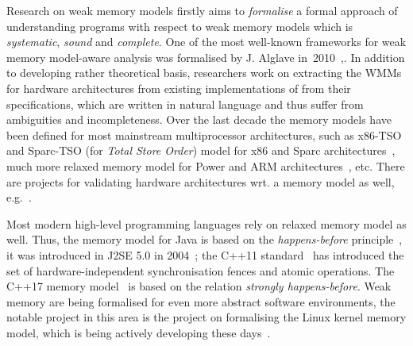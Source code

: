Research on weak memory models firstly aims to \textit{formalise} a formal approach of understanding programs with respect to weak memory models which is \textit{systematic}, \textit{sound} and \textit{complete}.
One of the most well-known frameworks for weak memory model-aware analysis was formalised by J. Alglave in~2010~\cite{alglave2010shared},.
In addition to developing rather theoretical basis, researchers work on extracting the WMMs for hardware architectures from existing implementations of from their specifications, which are written in natural language and thus suffer from ambiguities and incompleteness.
Over the last decade the memory models have been defined for most mainstream multiprocessor architectures, such as x86-TSO and Sparc-TSO (for \textit{Total Store Order}) model for x86 and Sparc architectures~\cite{owens2009better}, much more relaxed memory model for Power and ARM architectures~\cite{alglave2009semantics,sarkar2011understanding, alglave2014herding}, etc. %
There are projects for validating hardware architectures wrt. a memory model as well, e.g.~\cite{lustig2014pipecheck,lustig2016coatcheck}.



Most modern high-level programming languages rely on relaxed memory model as well.
Thus, the memory model for Java is based on the \textit{happens-before} principle~\cite{lamport1978time}, it was introduced in J2SE 5.0 in 2004~\cite{manson2005java}; the C++11 standard~\cite{iso2012iec} has introduced the set of hardware-independent synchronisation fences and atomic operations.
The C++17 memory model~\cite{batty2011mathematizing} is based on the relation \textit{strongly happens-before}. Weak memory are being formalised for even more abstract software environments, the notable project in this area is the project on formalising the Linux kernel memory model, which is being actively developing these days~\cite{alglave2018frightening, kernel1}.

